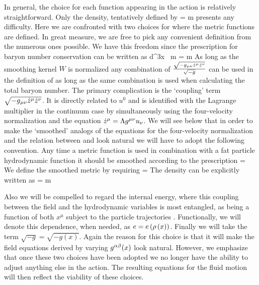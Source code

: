 \documentclass{article}
\begin{document}
In general, the choice for each function appearing in the action
is relatively straightforward.  Only the density, tentatively
defined by
\bes
  \gr = \frac { \sqrt{-\met{\gm}{\gn} \pdtraj{\gm} \pdtraj{\gn}}}
              { } m  \eqc
\ees
presents any difficulty.  Here we are confronted with two choices
for where the metric functions are defined.  In great measure, we
are free to pick any convenient definition from the numerous ones
possible. We have this freedom since the prescription for baryon
number conservation can be written as
\bes
  \int d^3x \, \rho {}
                         { \sqrt{-\met{\gm}{\gn} \ptraj{\gm} \ptraj{\nu}}}
                         m 
  = m \eqp
\ees
As long as the smoothing kernel $W$ is normalized any combination
of $\frac{ \sqrt{- {g}{{}_{\mu \nu} }   {\dot {{z}}}{{}^{\mu} }   {\dot {{z}}}{{}^{\nu} }  }}{
\sqrt{-g}}$ can be used in the definition of \gr as long as the
same combination is used when calculating the total baryon number.
The primary complication is the `coupling' term
$\sqrt{- {g}{{}_{\mu \nu} }   {\dot {{z}}}{{}^{\mu} }   {\dot {{z}}}{{}^{\nu} }  }$. It is
directly related to $u^0$ and is identified with the Lagrange
multiplier \gL in the continuum case by simultaneously using the
four-velocity normalization and the equation $ {\dot {{z}}}{{}^{\mu} }  = \Lambda
 {g}{\ensuremath{{}^{\mu \nu} } }   {u}{\ensuremath{{}_{\nu} } } $.  We will see below that in order to
make the `smoothed' analogs of the equations for the four-velocity
normalization and the relation between \pdtraj{\gm} and \pvel{\gm}
look natural we will have to adopt the following convention.  Any
time a metric function is used in combination with a fat particle
hydrodynamic function it should be smoothed according to the
prescription
\be\label{eq:inv_sm_met}
  \simet{\gm\gn}\parg =  \imet{\gm}{\gn}\farg {} \eqp
\ee
We define the smoothed metric \sura{\met{\gm}{\gn}} by requiring
\be\label{eq:sm_met}
\simet{\gm\gn} \smet{\gn\gr} = \Kd{\gm}{\gr} \eqp
\ee
The density can be explicitly written as
\be\label{eq:rho_def}
    \gr = m \frac{ \sqrt{-\smet{\gm\gn} \pdtraj{\gm} \pdtraj{\gn}}}
                 { }  \eqp
\ee

Also we will be compelled to regard the internal energy, where
this coupling between the field and the hydrodynamic variables is
most entangled, as being a function of both $x^{\mu}$ subject to
the particle trajectories \ptraj{\gm}.  Functionally, we will
denote this dependence, when needed, as $e = e\left( {\rho\left( {x} \right)} \right)$.  Finally we
will take the term $\sqrt{-g} = \sqrt{-g(x)}$.  Again the reason
for this choice is that it will make the field equations derived
by varying $ {g}{{}^{\alpha \beta} } (x)$ look natural.  However, we
emphasize that once these two choices have been adopted we no
longer have the ability to adjust anything else in the action. The
resulting equations for the fluid motion will then reflect the
viability of these choices.
\end{document}
